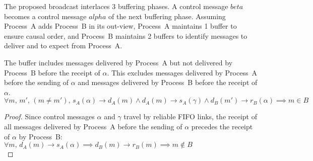 The proposed broadcast interlaces 3 buffering phases. A control message $beta$
becomes a control message $alpha$ of the next buffering phase. Assuming
Process~A adds Process~B in its out-view, Process~A maintains 1 buffer to ensure
causal order, and Process~B maintains 2 buffers to identify messages to deliver
and to expect from Process~A. 

\begin{lemma}
  The buffer includes messages delivered by Process~A but not delivered by
  Process~B before the receipt of $\alpha$. This excludes messages delivered by
  Process~A before the sending of $\alpha$ and messages delivered by Process~B
  before the receipt of $\alpha$.\\
  $\forall m,\,m',\,(m\neq m'),\,
  s_A(\alpha) \rightarrow d_A(m) \wedge
  d_A(m) \rightarrow s_A(\gamma) \wedge
  d_B(m') \rightarrow r_B(\alpha) \implies m \in B$
\end{lemma}

\begin{proof}
  Since control messages $\alpha$ and $\gamma$ travel by reliable FIFO links,
  the receipt of all messages delivered by Process~A before the sending of
  $\alpha$ precedes the receipt of $\alpha$ by Process~B:\\
  $\forall m,\, d_A(m) \rightarrow s_A(\alpha) \implies d_B(m) \rightarrow
  r_B(m) \implies m \not\in B$\\
\end{proof}



